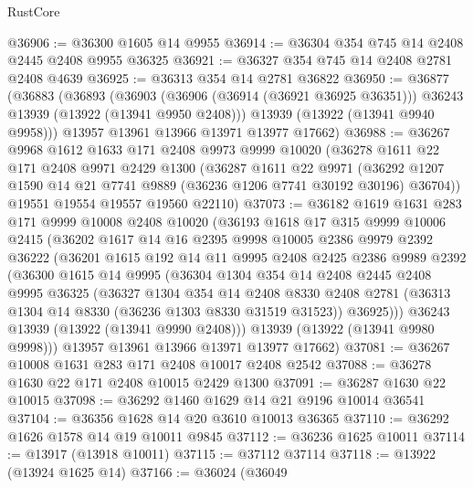 \begin{lexlean}{RustCore}
\begin{coremodule}
@36906 := @36300 @1605 @14 @9955
@36914 := @36304 @354 @745 @14 @2408 @2445 @2408 @9955 @36325
@36921 := @36327 @354 @745 @14 @2408 @2781 @2408 @4639
@36925 := @36313 @354 @14 @2781 @36822
@36950 := @36877
    (@36883
      (@36893
        (@36903
          (@36906 (@36914 (@36921 @36925 @36351)))
          @36243
          @13939
          (@13922 (@13941 @9950 @2408)))
        @13939
        (@13922 (@13941 @9940 @9958)))
      @13957
      @13961
      @13966
      @13971
      @13977
      @17662)
@36988 := @36267
    @9968
    @1612
    @1633
    @171
    @2408
    @9973
    @9999
    @10020
    (@36278
      @1611
      @22
      @171
      @2408
      @9971
      @2429
      @1300
      (@36287
        @1611
        @22
        @9971
        (@36292 @1207 @1590 @14 @21 @7741 @9889 (@36236 @1206 @7741 @30192 @30196) @36704))
      @19551
      @19554
      @19557
      @19560
      @22110)
@37073 := @36182
    @1619
    @1631
    @283
    @171
    @9999
    @10008
    @2408
    @10020
    (@36193
      @1618
      @17
      @315
      @9999
      @10006
      @2415
      (@36202
        @1617
        @14
        @16
        @2395
        @9998
        @10005
        @2386
        @9979
        @2392
        @36222
        (@36201
          @1615
          @192
          @14
          @11
          @9995
          @2408
          @2425
          @2386
          @9989
          @2392
          (@36300
            @1615
            @14
            @9995
            (@36304
              @1304
              @354
              @14
              @2408
              @2445
              @2408
              @9995
              @36325
              (@36327
                @1304
                @354
                @14
                @2408
                @8330
                @2408
                @2781
                (@36313 @1304 @14 @8330 (@36236 @1303 @8330 @31519 @31523))
                @36925)))
          @36243
          @13939
          (@13922 (@13941 @9990 @2408)))
        @13939
        (@13922 (@13941 @9980 @9998)))
      @13957
      @13961
      @13966
      @13971
      @13977
      @17662)
@37081 := @36267 @10008 @1631 @283 @171 @2408 @10017 @2408 @2542
@37088 := @36278 @1630 @22 @171 @2408 @10015 @2429 @1300
@37091 := @36287 @1630 @22 @10015
@37098 := @36292 @1460 @1629 @14 @21 @9196 @10014 @36541
@37104 := @36356 @1628 @14 @20 @3610 @10013 @36365
@37110 := @36292 @1626 @1578 @14 @19 @10011 @9845
@37112 := @36236 @1625 @10011
@37114 := @13917 (@13918 @10011)
@37115 := @37112 @37114
@37118 := @13922 (@13924 @1625 @14)
@37166 := @36024
    (@36049

\end{coremodule}
\end{lexlean}
